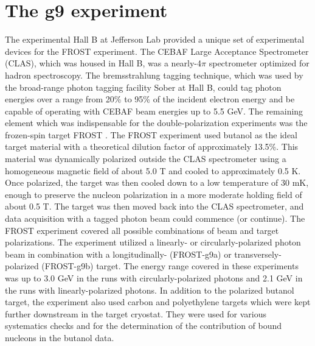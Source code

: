 \section{The g9 experiment}
The experimental Hall B at Jefferson Lab provided a unique set of experimental devices for the FROST experiment. The CEBAF Large Acceptance Spectrometer (CLAS)\cite{CLAS}, which was housed in Hall B, was a nearly-4$\pi$ spectrometer optimized for hadron spectroscopy. The bremsstrahlung tagging technique, which was used by the broad-range photon tagging facility Sober\cite{Sober_2000} at Hall B, could tag photon energies over a range from 20\% to 95\% of the incident electron energy and be capable of operating with CEBAF beam energies up to 5.5 GeV. The remaining element which was indispensable for the double-polarization experiments was the frozen-spin target FROST \cite{Keith_2012}. The FROST experiment used butanol as the ideal target material with a theoretical dilution factor of approximately 13.5\%. This material was dynamically polarized outside the CLAS spectrometer using a homogeneous magnetic field of about 5.0 T and cooled to approximately 0.5 K. Once polarized, the target was then cooled down to a low temperature of 30 mK, enough to preserve the nucleon polarization in a more moderate holding field of about 0.5 T. The target was then moved back into the CLAS spectrometer, and data acquisition with a tagged photon beam could commence (or continue). The FROST experiment covered all possible combinations of beam and target polarizations. The experiment utilized a linearly- or circularly-polarized photon beam in combination with a longitudinally- (FROST-g9a) or transversely-polarized (FROST-g9b) target. The energy range covered in these experiments was up to 3.0 GeV in the runs with circularly-polarized photons and 2.1 GeV in the runs with linearly-polarized photons. In addition to the polarized butanol target, the experiment also used carbon and polyethylene targets which were kept further downstream in the target cryostat. They were used for various systematics checks and for the determination of the contribution of bound nucleons in the butanol data.
